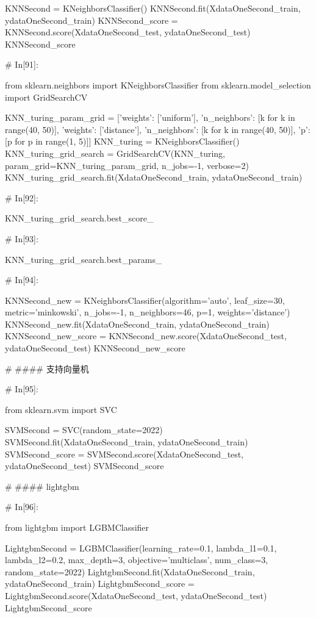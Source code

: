 \documentclass{MathorCupmodeling}
\begin{document}
\begin{python}
	KNNSecond = KNeighborsClassifier()
	KNNSecond.fit(XdataOneSecond_train, ydataOneSecond_train)
	KNNSecond_score = KNNSecond.score(XdataOneSecond_test, ydataOneSecond_test)
	KNNSecond_score
	
	# In[91]:
	
	
	from sklearn.neighbors import KNeighborsClassifier
	from sklearn.model_selection import GridSearchCV
	
	KNN_turing_param_grid = [{'weights': ['uniform'],
							  'n_neighbors': [k for k in range(40, 50)]},
							 {'weights': ['distance'],
							  'n_neighbors': [k for k in range(40, 50)],
							  'p': [p for p in range(1, 5)]}]
	KNN_turing = KNeighborsClassifier()
	KNN_turing_grid_search = GridSearchCV(KNN_turing,
										  param_grid=KNN_turing_param_grid,
										  n_jobs=-1,
										  verbose=2)
	KNN_turing_grid_search.fit(XdataOneSecond_train, ydataOneSecond_train)
	
	# In[92]:
	
	
	KNN_turing_grid_search.best_score_
	
	# In[93]:
	
	
	KNN_turing_grid_search.best_params_
	
	# In[94]:
	
	
	KNNSecond_new = KNeighborsClassifier(algorithm='auto', leaf_size=30,
										 metric='minkowski',
										 n_jobs=-1,
										 n_neighbors=46, p=1,
										 weights='distance')
	KNNSecond_new.fit(XdataOneSecond_train, ydataOneSecond_train)
	KNNSecond_new_score = KNNSecond_new.score(XdataOneSecond_test, ydataOneSecond_test)
	KNNSecond_new_score
	
	# #### 支持向量机
	
	# In[95]:
	
	
	from sklearn.svm import SVC
	
	SVMSecond = SVC(random_state=2022)
	SVMSecond.fit(XdataOneSecond_train, ydataOneSecond_train)
	SVMSecond_score = SVMSecond.score(XdataOneSecond_test, ydataOneSecond_test)
	SVMSecond_score
	
	# #### lightgbm
	
	# In[96]:
	
	
	from lightgbm import LGBMClassifier
	
	LightgbmSecond = LGBMClassifier(learning_rate=0.1,
									lambda_l1=0.1,
									lambda_l2=0.2,
									max_depth=3,
									objective='multiclass',
									num_class=3,
									random_state=2022)
	LightgbmSecond.fit(XdataOneSecond_train, ydataOneSecond_train)
	LightgbmSecond_score = LightgbmSecond.score(XdataOneSecond_test, ydataOneSecond_test)
	LightgbmSecond_score
	

\end{python}
\end{document}
